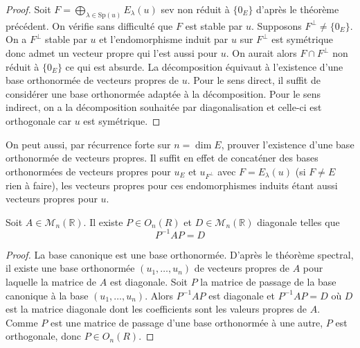 \begin{proof}

Soit $F = \bigoplus_{\lambda \in \text{Sp}(u)} E_\lambda(u)$ sev non réduit à $\{0_E\}$ d'après le théorème précédent. On vérifie sans difficulté que $F$ est stable par $u$. Supposons $F^\perp \neq \{0_E\}$. On a $F^\perp$ stable par $u$ et l'endomorphisme induit par $u$ sur $F^\perp$ est symétrique donc admet un vecteur propre qui l'est aussi pour $u$. On aurait alors $F \cap F^\perp$ non réduit à $\{0_E\}$ ce qui est absurde. La décomposition équivaut à l'existence d'une base orthonormée de vecteurs propres de $u$. Pour le sens direct, il suffit de considérer une base orthonormée adaptée à la décomposition. Pour le sens indirect, on a la décomposition souhaitée par diagonalisation et celle-ci est orthogonale car $u$ est symétrique.

\end{proof}

\begin{remark}

On peut aussi, par récurrence forte sur $n = \dim E$, prouver l'existence d'une base orthonormée de vecteurs propres. Il suffit en effet de concaténer des bases orthonormées de vecteurs propres pour $u_E$ et $u_{F^\perp}$ avec $F = E_\lambda(u)$ (si $F \neq E$ rien à faire), les vecteurs propres pour ces endomorphismes induits étant aussi vecteurs propres pour $u$.

\end{remark}

\begin{corollary}
\label{cor:7}

Soit $A \in \mathcal{M}_n(\mathbb{R})$. Il existe $P \in O_n(R)$ et $D \in \mathcal{M}_n(\mathbb{R})$ diagonale telles que
\[
P^{-1}AP = D
\]

\end{corollary}

\begin{proof}

La base canonique est une base orthonormée. D'après le théorème spectral, il existe une base orthonormée $(u_1, \dots, u_n)$ de vecteurs propres de $A$ pour laquelle la matrice de $A$ est diagonale. Soit $P$ la matrice de passage de la base canonique à la base $(u_1, \dots, u_n)$. Alors $P^{-1}AP$ est diagonale et $P^{-1}AP = D$ où $D$ est la matrice diagonale dont les coefficients sont les valeurs propres de $A$. Comme $P$ est une matrice de passage d'une base orthonormée à une autre, $P$ est orthogonale, donc $P \in O_n(R)$.

\end{proof}

